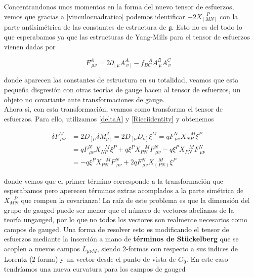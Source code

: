 \documentclass{article}
\numberwithin{equation}{section}
\begin{document}
Concentrandonos unos momentos en la forma del nuevo tensor de esfuerzos, vemos que gracias a \ref{vinculocuadratico} podemos identificar $ - 2X_{\left[M N\right]}^{\ \ \ \ P} $ con la parte antisimétrica de las constantes de estructura de $ \mathfrak{g} $. Esto no es del todo lo que esperabamos ya que las estructuras de Yang-Mills para el tensor de esfuerzos vienen dadas por

\begin{equation}
F^A_{\ \mu \nu} = 2 \partial_{\left[ \mu\right.} A^A_{\ \left. \nu \right]} - f_{B C}^{\ \ \ \ A} A^B_{\ \mu} A^C_{\ \nu} 
\end{equation}

donde aparecen las constantes de estructura en su totalidad, veamos que esta pequeña disgresión con otras teorías de gauge hacen al tensor de esfuerzos, un objeto no covariante ante transformaciones de gauge.\\


Ahora si, con esta transformación, veamos como transforma el tensor de esfuerzos. Para ello, utilizamos \ref{deltaA} y \ref{Ricciidentity} y obtenemos

\begin{equation}
\begin{aligned}
\delta F^M_{\ \mu \nu} &= 2 D_{\left[ \mu \right.} \delta M^A_{\left. \nu\right]} = 2 D_{\left[ \mu \right.} D_{\left. \nu\right]} \xi^M = q F^N_{\ \mu \nu} X_{N P}^{\ \ \ \ M} \xi^P\\
&=q F^N_{\ \mu \nu} X_{N P}^{\ \ \ \ M} \xi^P + q \xi^P X_{P N}^{\ \ \ \ M} F^N_{\ \mu \nu} - q \xi^P X_{P N}^{\ \ \ \ M} F^N_{\ \mu \nu}\\
&= - q \xi^P X_{P N}^{\ \ \ \ M} F^N_{\ \mu \nu} + 2 q F^N_{\ \mu \nu} X_{\left(P N\right)}^{\ \ \ \ M} \xi^P
\end{aligned}
\end{equation}


donde vemos que el primer término corresponde a la transformación que esperabamos pero aperecen términos extras acomplados a la parte simétrica de $ X_{M N}^{\ \ \ \ P} $ que rompen la covarianza! La raíz de este problema es que la dimensión del grupo de gauged puede ser menor que el número de vectores abelianos de la teoría ungauged, por lo que no todos los vectores son realmente necesarios como campos de gauged. Una forma de resolver esto es modificando el tensor de esfuerzos mediante la inserción a mano de \textbf{términos de Stückelberg} que se acoplen a nuevos campos $ L_{\mu \nu M} $, siendo 2-formas con respecto a sus indices de Lorentz (2-forma) y un vector desde el punto de vista de $ G_0 $. En este caso tendríamos una nueva curvatura para los campos de gauged
\end{document}
